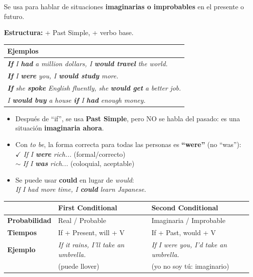 \documentclass[12pt,a4paper]{article}
\begin{document}
\begin{cajagrammar}
Se usa para hablar de situaciones \textbf{imaginarias o improbables} en el presente o futuro.

\medskip
\textbf{Estructura:}  + Past Simple,  + verbo base.

\begin{tabularx}{\textwidth}{@{} X @{}}
\toprule
\textbf{Ejemplos} \\
\midrule
\textit{\textbf{If} I \textbf{had} a million dollars, I \textbf{would travel} the world.} \\
\textit{\textbf{If} I \textbf{were} you, I \textbf{would study} more.} \\
\textit{\textbf{If} she \textbf{spoke} English fluently, she \textbf{would get} a better job.} \\
\textit{I \textbf{would buy} a house \textbf{if} I \textbf{had} enough money.} \\
\bottomrule
\end{tabularx}

\medskip
\begin{cajaejemplo}
\begin{itemize}[nosep, leftmargin=0.8cm]
  \item Después de ``if'', se usa \textbf{Past Simple}, pero NO se habla del pasado: es una situación \textbf{imaginaria ahora}.
  \item Con \textit{to be}, la forma correcta para todas las personas es \textbf{``were''} (no ``was''):\\
    $\checkmark$ \textit{If I \textbf{were} rich...} \quad (formal/correcto)\\
    $\sim$ \textit{If I \textbf{was} rich...} \quad (coloquial, aceptable)
  \item Se puede usar \textbf{could} en lugar de \textit{would}:\\
    \textit{If I had more time, I \textbf{could} learn Japanese.}
\end{itemize}
\end{cajaejemplo}
\end{cajagrammar}

\begin{cajagrammar}
\begin{tabularx}{\textwidth}{@{} l X X @{}}
\toprule
& \textbf{First Conditional} & \textbf{Second Conditional} \\
\midrule
\textbf{Probabilidad} & Real / Probable & Imaginaria / Improbable \\
\textbf{Tiempos} & If + Present, will + V & If + Past, would + V \\
\textbf{Ejemplo} & \textit{If it rains, I'll take an umbrella.} & \textit{If I were you, I'd take an umbrella.} \\
& (puede llover) & (yo no soy tú: imaginario) \\
\bottomrule
\end{tabularx}
\end{cajagrammar}
\end{document}
